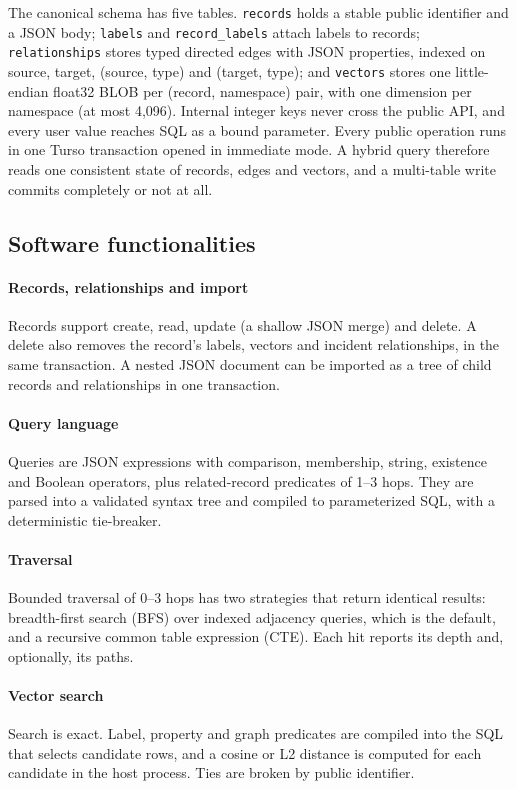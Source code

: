 \documentclass[preprint,12pt,a4paper]{elsarticle}
\newcommand{\code}[1]{\texttt{#1}}
\begin{document}
The canonical schema has five tables. \code{records} holds a stable public identifier and a JSON body; \code{labels} and \code{record\_labels} attach labels to records; \code{relationships} stores typed directed edges with JSON properties, indexed on source, target, (source, type) and (target, type); and \code{vectors} stores one little-endian float32 BLOB per (record, namespace) pair, with one dimension per namespace (at most 4,096). Internal integer keys never cross the public API, and every user value reaches SQL as a bound parameter. Every public operation runs in one Turso transaction opened in immediate mode. A hybrid query therefore reads one consistent state of records, edges and vectors, and a multi-table write commits completely or not at all.

\subsection{Software functionalities}

\paragraph{Records, relationships and import} Records support create, read, update (a shallow JSON merge) and delete. A delete also removes the record's labels, vectors and incident relationships, in the same transaction. A nested JSON document can be imported as a tree of child records and relationships in one transaction.

\paragraph{Query language} Queries are JSON expressions with comparison, membership, string, existence and Boolean operators, plus related-record predicates of 1--3 hops. They are parsed into a validated syntax tree and compiled to parameterized SQL, with a deterministic tie-breaker.

\paragraph{Traversal} Bounded traversal of 0--3 hops has two strategies that return identical results: breadth-first search (BFS) over indexed adjacency queries, which is the default, and a recursive common table expression (CTE). Each hit reports its depth and, optionally, its paths.

\paragraph{Vector search} Search is exact. Label, property and graph predicates are compiled into the SQL that selects candidate rows, and a cosine or L2 distance is computed for each candidate in the host process. Ties are broken by public identifier.
\end{document}
